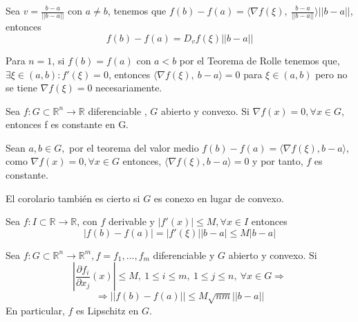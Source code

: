 \begin{obs}
Sea $ v = \frac{b - a}{||b-a||}$ con $ a\neq b$, tenemos que $f(b) - f(a) = \langle \nabla{f(\xi)} {,}\ \frac{b - a}{||b - a||} \rangle || b - a ||$, entonces \[f(b) - f(a) = D_vf(\xi)||b - a||\]
\end{obs}

\begin{obs}
Para $ n = 1$, si $f(b) = f(a)$ con $a<b$ por el Teorema de Rolle tenemos que, $\exists \xi\in(a,b): f'(\xi) = 0$, entonces $\langle \nabla{f(\xi)} {,}\ b - a \rangle = 0$ para $\xi \in(a,b)$ pero no se tiene $\nabla{f(\xi)} = 0 $ necesariamente. 
\end{obs}

\begin{cor}
Sea $f:G\subset \mathbb{R}^n\rightarrow \mathbb{R}$ diferenciable , $G$ abierto y convexo. Si $\nabla{f(x)}= 0 , \forall x\in G$, entonces f es constante en G. 
\end{cor}

\begin{dem}
Sean $ a,b\in G,$ por el teorema del valor medio $f(b)-f(a)= \langle \nabla f(\xi), b - a \rangle$, como $ \nabla f(x) = 0, \forall x \in G$ entonces, $\langle \nabla f(\xi), b-a \rangle = 0 $ y por tanto, $f$ es constante.
\end{dem}

\begin{obs}
El corolario también es cierto si $G$ es conexo en lugar de convexo.
\end{obs}

\begin{theo}
Sea $f: I\subset\mathbb{R}\rightarrow\mathbb{R}$, con $f$ derivable y $|f'(x)| \leq M, \forall x \in I$ entonces \[ |f(b) - f(a)| = |f'(\xi)||b-a| \leq M|b-a| \]
\end{theo}

\begin{prop}
Sea $f:G\subset \mathbb{R}^n\rightarrow \mathbb{R}^m, f = f_1,...,f_m$ diferenciable y $G$ abierto y convexo. Si \[  |\frac{\partial f_i}{\partial x_j}(x)| \leq M,\ 1\leq i \leq m ,\ 1\leq j\leq n, \ \forall x\in G \Rightarrow\] \[\Rightarrow ||f(b) - f(a)|| \leq M \sqrt{nm}||b-a|| \] En particular, $f$ es Lipschitz en $G$.
\end{prop}

